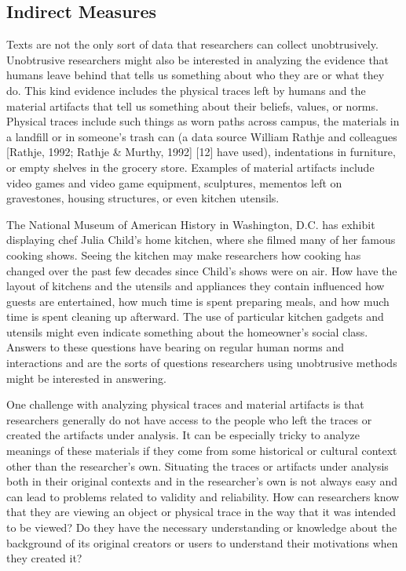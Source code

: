 \subsection{Indirect Measures}

Texts are not the only sort of data that researchers can collect unobtrusively. Unobtrusive researchers might also be interested in analyzing the evidence that humans leave behind that tells us something about who they are or what they do. This kind evidence includes the physical traces left by humans and the material artifacts that tell us something about their beliefs, values, or norms. Physical traces include such things as worn paths across campus, the materials in a landfill or in someone's trash can (a data source William Rathje and colleagues [Rathje, 1992; Rathje \& Murthy, 1992] [12] have used), indentations in furniture, or empty shelves in the grocery store. Examples of material artifacts include video games and video game equipment, sculptures, mementos left on gravestones, housing structures, or even kitchen utensils.

The National Museum of American History in Washington, D.C. has exhibit displaying chef Julia Child's home kitchen, where she filmed many of her famous cooking shows. Seeing the kitchen may make researchers how cooking has changed over the past few decades since Child's shows were on air. How have the layout of kitchens and the utensils and appliances they contain influenced how guests are entertained, how much time is spent preparing meals, and how much time is spent cleaning up afterward. The use of particular kitchen gadgets and utensils might even indicate something about the homeowner's social class. Answers to these questions have bearing on regular human norms and interactions and are the sorts of questions researchers using unobtrusive methods might be interested in answering.

One challenge with analyzing physical traces and material artifacts is that researchers generally do not have access to the people who left the traces or created the artifacts under analysis. It can be especially tricky to analyze meanings of these materials if they come from some historical or cultural context other than the researcher's own. Situating the traces or artifacts under analysis both in their original contexts and in the researcher's own is not always easy and can lead to problems related to validity and reliability. How can researchers know that they are viewing an object or physical trace in the way that it was intended to be viewed? Do they have the necessary understanding or knowledge about the background of its original creators or users to understand their motivations when they created it?

